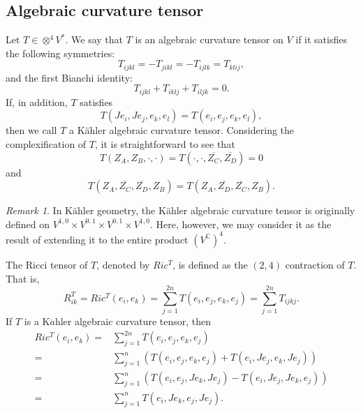 \documentclass{amsart}
\theoremstyle{definition}
\theoremstyle{remark}
\newtheorem{remark}[theorem]{Remark}
\numberwithin{equation}{section}
\begin{document}
\subsection{Algebraic curvature tensor}
Let $T \in { \otimes ^4}{V^ * }$. We say that $T$ is an algebraic curvature tensor on $V$ if it satisfies the following symmetries:
$${T_{ijkl}} =  - {T_{jikl}} =  - {T_{ijlk}} = {T_{klij}},$$
and the first Bianchi identity:
$${T_{ijkl}} + {T_{iklj}} + {T_{iljk}} = 0.$$
If, in addition, $T$ satisfies
$$T\left( {J{e_i},J{e_j},{e_k},{e_l}} \right) = T\left( {{e_i},{e_j},{e_k},{e_l}} \right),$$
then we call $T$  a K{\"a}hler algebraic curvature tensor. Considering the complexification of $T$, it is straightforward to see that
$$T\left( {{Z_A},{Z_B}, \cdot , \cdot } \right) = T\left( { \cdot , \cdot ,\overline {{Z_C}} ,\overline {{Z_D}} } \right) = 0$$
and
$$T\left( {{Z_A},\overline {{Z_C}} ,\overline {{Z_D}} ,{Z_B}} \right) = T\left( {{Z_A},\overline {{Z_D}} ,\overline {{Z_C}} ,{Z_B}} \right).$$
\begin{remark}
\label{remark2.4}
In K{\"a}hler geometry, the K{\"a}hler algebraic curvature tensor is originally defined on ${V^{1,0}} \times {V^{0,1}} \times {V^{0,1}} \times {V^{1,0}}$. Here, however, we may consider it as the result of extending it to the entire product  ${\left({V^\mathbb{C}}\right)}^4$.
\end{remark}


The Ricci tensor of $T$, denoted by  $Ric^T$, is defined as the $\left( 2,4 \right)$ contraction of $T$. That is,
$${R^T_{ik}} = Ric^T\left( {{e_i},{e_k}} \right) = \sum\limits_{j = 1}^{2n} {T\left( {{e_i},{e_j},{e_k},{e_j}} \right)}  = \sum\limits_{j = 1}^{2n} {{T_{ijkj}}}.$$
If $T$ is a K${\ddot a}$hler algebraic curvature tensor, then
\begin{equation}
\begin{aligned}
Ric^T\left( {{e_i},{e_k}} \right) =& \sum\limits_{j = 1}^{2n} {T\left( {{e_i},{e_j},{e_k},{e_j}} \right)} \\
 =& \sum\limits_{j = 1}^n {\left( {T\left( {{e_i},{e_j},{e_k},{e_j}} \right) + T\left( {{e_i},J{e_j},{e_k},J{e_j}} \right)} \right)} \\
 =& \sum\limits_{j = 1}^n {\left( {T\left( {{e_i},{e_j},J{e_k},J{e_j}} \right) - T\left( {{e_i},J{e_j},J{e_k},{e_j}} \right)} \right)} \\
 =& \sum\limits_{j = 1}^n {T\left( {{e_i},J{e_k},{e_j},J{e_j}} \right)} .
\end{aligned}
\end{equation}
\end{document}
